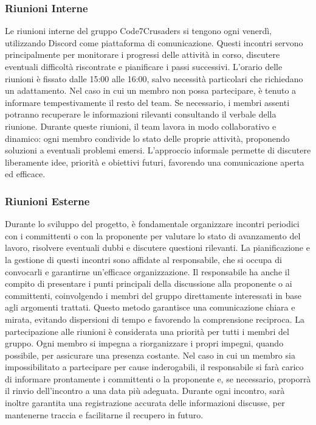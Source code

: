 \subsubsection{Riunioni Interne}
Le riunioni interne del gruppo Code7Crusaders si tengono ogni venerdì, utilizzando Discord come piattaforma di comunicazione. Questi incontri servono principalmente per monitorare i progressi delle attività in corso, discutere eventuali difficoltà riscontrate e pianificare i passi successivi. L’orario delle riunioni è fissato dalle 15:00 alle 16:00, salvo necessità particolari che richiedano un adattamento.
Nel caso in cui un membro non possa partecipare, è tenuto a informare tempestivamente il resto del team. Se necessario, i membri assenti potranno recuperare le informazioni rilevanti consultando il verbale della riunione.
Durante queste riunioni, il team lavora in modo collaborativo e dinamico: ogni membro condivide lo stato delle proprie attività, proponendo soluzioni a eventuali problemi emersi. L'approccio informale permette di discutere liberamente idee, priorità e obiettivi futuri, favorendo una comunicazione aperta ed efficace.

\subsubsection{Riunioni Esterne}
Durante lo sviluppo del progetto, è fondamentale organizzare incontri periodici con i committenti o con la proponente per valutare lo stato di avanzamento del lavoro, risolvere eventuali dubbi e discutere questioni rilevanti. La pianificazione e la gestione di questi incontri sono affidate al responsabile, che si occupa di convocarli e garantirne un’efficace organizzazione.
Il responsabile ha anche il compito di presentare i punti principali della discussione alla proponente o ai committenti, coinvolgendo i membri del gruppo direttamente interessati in base agli argomenti trattati. Questo metodo garantisce una comunicazione chiara e mirata, evitando dispersioni di tempo e favorendo la comprensione reciproca.
La partecipazione alle riunioni è considerata una priorità per tutti i membri del gruppo. Ogni membro si impegna a riorganizzare i propri impegni, quando possibile, per assicurare una presenza costante. Nel caso in cui un membro sia impossibilitato a partecipare per cause inderogabili, il responsabile si farà carico di informare prontamente i committenti o la proponente e, se necessario, proporrà il rinvio dell’incontro a una data più adeguata. Durante ogni incontro, sarà inoltre garantita una registrazione accurata delle informazioni discusse, per mantenerne traccia e facilitarne il recupero in futuro.

